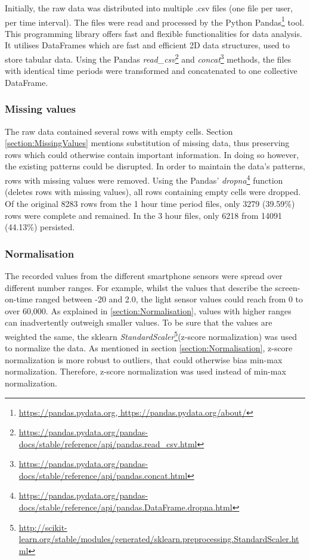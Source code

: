 Initially, the raw data was distributed into multiple .csv files (one file per user, per time interval). The files were read and processed by the Python Pandas\footnote{\url{https://pandas.pydata.org, https://pandas.pydata.org/about/}} tool. This programming library offers fast and flexible functionalities for data analysis. It utilises DataFrames which are fast and efficient 2D data structures, used to store tabular data. Using the Pandas \textit{read\_csv}\footnote{\url{https://pandas.pydata.org/pandas-docs/stable/reference/api/pandas.read_csv.html}} and \textit{concat}\footnote{\url{https://pandas.pydata.org/pandas-docs/stable/reference/api/pandas.concat.html}} methods, the files with identical time periods were transformed and concatenated to one collective DataFrame. 


\subsubsection{Missing values}
The raw data contained several rows with empty cells. Section \ref{section:MissingValues} mentions substitution of missing data, thus preserving rows which could otherwise contain important information. In doing so however, the existing patterns could be disrupted. In order to maintain the data's patterns, rows with missing values were removed. Using the Pandas' \textit{dropna}\footnote{\url{https://pandas.pydata.org/pandas-docs/stable/reference/api/pandas.DataFrame.dropna.html}} function (deletes rows with missing values), all rows containing empty cells were dropped. Of the original 8283 rows from the 1 hour time period files, only 3279 (39.59\%) rows were complete and remained. In the 3 hour files, only 6218 from 14091 (44.13\%) persisted.

\subsubsection{Normalisation}
The recorded values from the different smartphone sensors were spread over different number ranges. For example, whilst the values that describe the screen-on-time ranged between -20 and 2.0, the light sensor values could reach from 0 to over 60,000. As explained in \ref{section:Normalisation}, values with higher ranges can inadvertently outweigh smaller values. To be sure that the values are weighted the same, the sklearn \textit{StandardScaler}\footnote{\url{http://scikit-learn.org/stable/modules/generated/sklearn.preprocessing.StandardScaler.html}}(z-score normalization) was used to normalize the data. As mentioned in section \ref{section:Normalisation}, z-score normalization is more robust to outliers, that could otherwise bias min-max normalization. Therefore, z-score normalization was used instead of min-max normalization.


